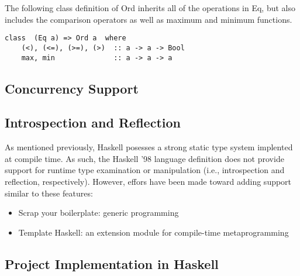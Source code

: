 \documentclass[titlepage,12pt]{article}
\newcommand{\bi}{\begin{itemize}}
\newcommand{\ei}{\end{itemize}}
\begin{document}
The following class definition of Ord inherits all of the operations in Eq, but also includes the comparison 
operators as well as maximum and minimum functions.

\begin{verbatim}
class  (Eq a) => Ord a  where
    (<), (<=), (>=), (>)  :: a -> a -> Bool
    max, min              :: a -> a -> a
\end{verbatim}

\subsection{Concurrency Support}


\subsection{Introspection and Reflection}

As mentioned previously, Haskell posesses a strong static type system
implented at compile time. As such, the Haskell '98 language definition
does not provide support for runtime type examination or manipulation
(i.e., introspection and reflection, respectively).  However, effors have been
made toward adding support similar to these features:
\bi
    \item Scrap your boilerplate: generic programming~\cite{haskell-syb}
    \item Template Haskell: an extension module for compile-time metaprogramming~\cite{haskell-th}
\ei


\newpage
\begin{appendices}
\section{Project Implementation in Haskell}
\inputminted{haskell}{src/InfixPostfix.hs}
\newpage
\inputminted{haskell}{src/InfixPostfixTest.hs}
\end{appendices}


\newpage


\end{document}
